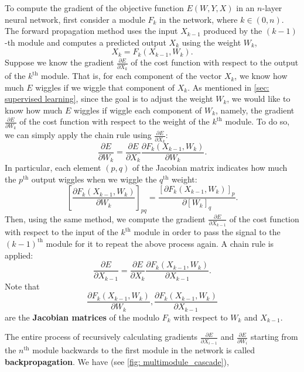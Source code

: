 To compute the gradient of the objective function $E(W,Y,X)$ in an $n$-layer neural network, first consider a module $F_k$ in the network, where $k\in (0, n)$.
The forward propagation method uses the input $X_{k-1}$ produced by the $(k-1)$-th module and computes a predicted output $X_k$ using the weight $W_k$, 
\[ X_k=F_k(X_{k-1},W_k). \]
Suppose we know the gradient $\frac{\partial E}{\partial X_k}$ of the cost function with respect to the output of the $k^\text{th}$ module.
That is, for each component of the vector $X_k$, we know how much $E$ wiggles if we wiggle that component of $X_k$.
As mentioned in \cref{sec: supervised learning}, since the goal is to adjust the weight $W_k$, we would like to know how much $E$ wiggles if wiggle each component of $W_k$, namely, the gradient $\frac{\partial E}{\partial W_k}$ of the cost function with respect to the weight of the $k^\text{th}$ module.
To do so, we can simply apply the chain rule using $\frac{\partial E}{\partial X_k}$: 
\[
\frac{\partial E}{\partial W_k} = \frac{\partial E}{\partial X_k} \frac{\partial F_k(X_{k-1},W_k)}{\partial W_k}.
\]
In particular, each element $(p,q)$ of the Jacobian matrix indicates how much the $p^\text{th}$ output wiggles when we wiggle the $q^\text{th}$ weight:
\[
\left[ \frac{\partial F_k(X_{k-1},W_k)}{\partial W_k} \right]_{pq} = \frac{[\partial F_k(X_{k-1},W_k)]_p}{\partial [W_k]_q}.
\]
Then, using the same method, we compute the gradient $\frac{\partial E}{\partial X_{k-1}}$ of the cost function with respect to the input of the $k^\text{th}$ module in order to pass the signal to the $(k-1)^\text{th}$ module for it to repeat the above process again.
A chain rule is applied:
\[
\frac{\partial E}{\partial X_{k-1}} = \frac{\partial E}{\partial X_k} \frac{\partial F_k(X_{k-1},W_k)}{\partial X_{k-1}}.
\]
Note that 
\[
\frac{\partial F_k(X_{k-1},W_k)}{\partial W_k}, \frac{\partial F_k(X_{k-1},W_k)}{\partial X_{k-1}}
\]
are the \textbf{Jacobian matrices} of the modulo $F_k$ with respect to  $W_k$ and $X_{k-1}$.

The entire process of recursively calculating gradients $\frac{\partial E}{\partial X_{i-1}}$ and $\frac{\partial E}{\partial W_i}$ starting from the $n^\text{th}$ module backwards to the first module in the network is called \textbf{backpropagation}.
We have (see \cref{fig: multimodule_cascade}),

